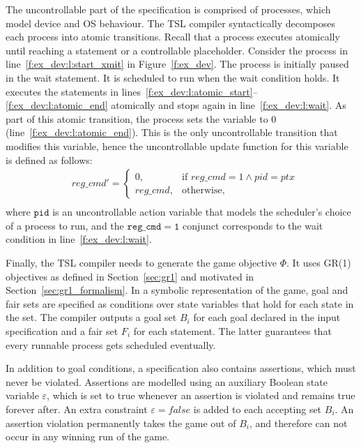 The uncontrollable part of the specification is comprised of \tsl processes, which model device and OS behaviour.  The TSL compiler syntactically decomposes each process into atomic transitions.  Recall that a process executes atomically until reaching a  statement or a controllable placeholder.  Consider the  process in line~\ref{f:ex_dev:l:start_xmit} in Figure~\ref{f:ex_dev}.  The process is initially paused in the wait statement.  It is scheduled to run when the wait condition holds.  It executes the statements in lines~\ref{f:ex_dev:l:atomic_start}--\ref{f:ex_dev:l:atomic_end} atomically and stops again in line~\ref{f:ex_dev:l:wait}.  As part of this atomic transition, the process sets the  variable to 0 (line~\ref{f:ex_dev:l:atomic_end}).  This is the only uncontrollable transition that modifies this variable, hence the uncontrollable update function for this variable is defined as follows:
$$
\begin{aligned}
    &reg\_cmd' = \begin{cases}
                    0       , & \text{if } reg\_cmd=1 \land pid=ptx\\
                    reg\_cmd, & \text{otherwise},
                 \end{cases}\\
\end{aligned}
$$
where $\mathtt{pid}$ is an uncontrollable action variable that models the scheduler's choice of a process to run, and the $\mathtt{reg\_cmd=1}$ conjunct corresponds to the wait condition in line~\ref{f:ex_dev:l:wait}.
  
Finally, the TSL compiler needs to generate the game objective $\Phi$. It uses GR(1) objectives as defined in Section~\ref{sec:gr1} and motivated in Section~\ref{sec:gr1_formalism}. In a symbolic representation of the game, goal and fair sets are specified as conditions over state variables that hold for each state in the set.  The \tsl compiler outputs a goal set $B_i$ for each goal declared in the input specification and a fair set $F_i$ for each  statement.  The latter guarantees that every runnable process gets scheduled eventually.
        
In addition to goal conditions, a \tsl specification also contains assertions, which must never be violated.  Assertions are modelled using an auxiliary Boolean state variable $\varepsilon$, which is set to true whenever an assertion is violated and remains true forever after.  An extra constraint $\varepsilon=false$ is added to each accepting set $B_i$.  An assertion violation permanently takes the game out of $B_i$, and therefore can not occur in any winning run of the game.

